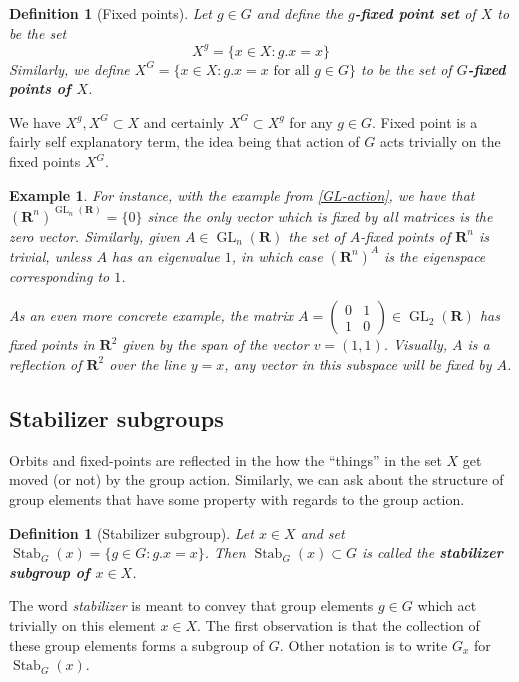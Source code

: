 \documentclass[12pt]{article}
\numberwithin{equation}{subsection}
\newtheorem{defn}[subsection]{Definition}
\theoremstyle{note}
\newtheorem{example}[subsection]{Example}
\newcommand{\GL}{\operatorname{GL}}
\newcommand{\Stab}{\operatorname{Stab}}
\begin{document}
\begin{defn}[Fixed points]
	Let $g\in G$ and define the \textbf{$g$-fixed point set} of $X$ to be the set \begin{equation}
		X^g=\{ x\in X : g.x=x\}
	\end{equation}
	Similarly, we define $X^G=\{ x\in X: g.x=x \text{ for all $g\in G$}\}$ to be the set of \textbf{$G$-fixed points of $X$}. 
\end{defn}

We have $X^g, X^G\subset X$ and certainly $X^G\subset X^g$ for any $g\in G$. Fixed point is a fairly self explanatory term, the idea being that action of $G$ acts trivially on the fixed points $X^G$. 

\begin{example}For instance, with the example from \ref{GL-action}, we have that $(\mathbf{R}^n)^{\GL_n(\mathbf{R})}=\{0\}$ since the only vector which is fixed by all matrices is the zero vector. Similarly, given $A\in \GL_n(\mathbf{R})$ the set of $A$-fixed points of $\mathbf{R}^n$ is trivial, unless $A$ has an eigenvalue $1$, in which case $(\mathbf{R}^n)^A$ is the eigenspace corresponding to $1$. 

As an even more concrete example, the matrix $A=\begin{pmatrix} 0 & 1 \\ 1 & 0\end{pmatrix}\in\GL_2(\mathbf{R})$ has fixed points in $\mathbf{R}^2$ given by the span of the vector $v=(1,1)$. Visually, $A$ is a reflection of $\mathbf{R}^2$ over the line $y=x$, any vector in this subspace will be fixed by $A$.\end{example}



\subsection{Stabilizer subgroups}
Orbits and fixed-points are reflected in the how the ``things'' in the set $X$ get moved (or not) by the group action. Similarly, we can ask about the structure of group elements that have some property with regards to the group action. 

\begin{defn}[Stabilizer subgroup]
	Let $x\in X$ and set $\Stab_G(x)=\{ g\in G : g.x=x \}$. Then $\Stab_G(x)\subset G$ is called the \textbf{stabilizer subgroup of $x\in X$}.\end{defn}

The word \textit{stabilizer} is meant to convey that group elements $g\in G$ which act trivially on this element $x\in X$. The first observation is that the collection of these group elements forms a subgroup of $G$. Other notation is to write $G_x$ for $\Stab_G(x)$.
	
\end{document}
